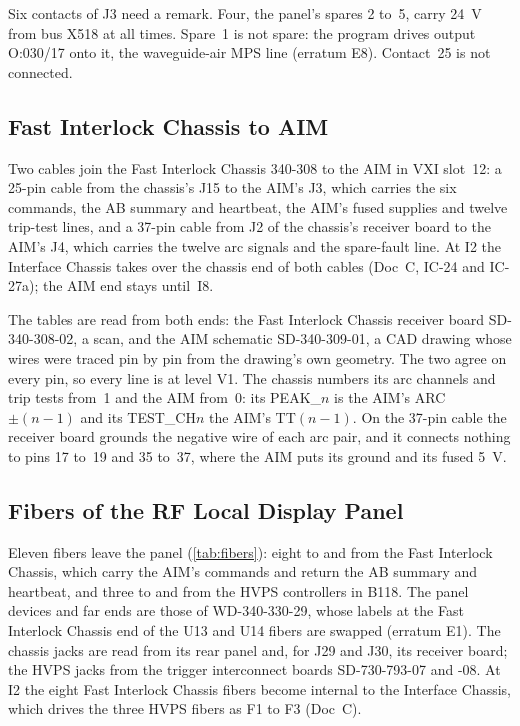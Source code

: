 

Six contacts of J3 need a remark. Four, the panel's spares 2 to~5, carry
\qty{24}{\volt} from bus X518 at all times. Spare~1 is not spare: the program drives
output O:030/17 onto it, the waveguide-air MPS line (erratum E8). Contact~25 is not
connected.

\subsection{Fast Interlock Chassis to AIM}\label{sec:fic-aim}

Two cables join the Fast Interlock Chassis 340-308 to the AIM in VXI slot~12: a
25-pin cable from the chassis's J15 to the AIM's J3, which carries the six commands,
the AB summary and heartbeat, the AIM's fused supplies and twelve trip-test lines,
and a 37-pin cable from J2 of the chassis's receiver board to the AIM's J4, which
carries the twelve arc signals and the spare-fault line. At I2 the Interface Chassis
takes over the chassis end of both cables (Doc~C, IC-24 and IC-27a); the AIM end stays
until~I8.

The tables are read from both ends: the Fast Interlock Chassis receiver board
SD-340-308-02, a scan, and the AIM schematic SD-340-309-01, a CAD drawing whose wires
were traced pin by pin from the drawing's own geometry. The two agree on every pin,
so every line is at level V1. The chassis numbers its arc channels and trip tests
from~1 and the AIM from~0: its PEAK\_$n$ is the AIM's ARC$\pm(n-1)$ and its
TEST\_CH$n$ the AIM's TT$(n-1)$. On the 37-pin cable the receiver board grounds the
negative wire of each arc pair, and it connects nothing to pins 17 to~19 and 35
to~37, where the AIM puts its ground and its fused \qty{5}{\volt}.





\subsection{Fibers of the RF Local Display Panel}\label{sec:fibers}

Eleven fibers leave the panel (\cref{tab:fibers}): eight to and from the Fast Interlock
Chassis, which carry the AIM's commands and return the AB summary and heartbeat, and
three to and from the HVPS controllers in B118. The panel devices and far ends are
those of WD-340-330-29, whose labels at the Fast Interlock Chassis end of the U13 and
U14 fibers are swapped (erratum E1). The chassis jacks are read from its rear panel
and, for J29 and J30, its receiver board; the HVPS jacks from the trigger interconnect
boards SD-730-793-07 and -08. At I2 the eight Fast Interlock Chassis fibers become
internal to the Interface Chassis, which drives the three HVPS fibers as F1 to F3
(Doc~C).

